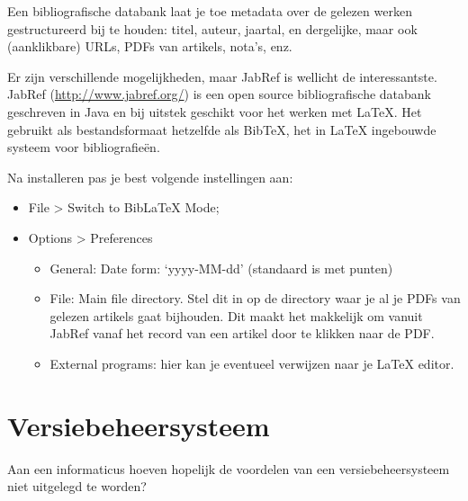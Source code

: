 Een bibliografische databank laat je toe metadata over de gelezen werken gestructureerd bij te houden: titel, auteur, jaartal, en dergelijke, maar ook (aanklikbare) URLs, PDFs van artikels, nota's, enz.

Er zijn verschillende mogelijkheden, maar JabRef is wellicht de interessantste. JabRef (\url{http://www.jabref.org/}) is een open source bibliografische databank geschreven in Java en bij uitstek geschikt voor het werken met {\LaTeX}. Het gebruikt als bestandsformaat hetzelfde als Bib{\TeX}, het in {\LaTeX} ingebouwde systeem voor bibliografieën.

Na installeren pas je best volgende instellingen aan:

\begin{itemize}
  \item File > Switch to BibLaTeX Mode;
  \item Options > Preferences
    \begin{itemize}
      \item General: Date form: `yyyy-MM-dd' (standaard is met punten)
      \item File: Main file directory. Stel dit in op de directory waar je al je PDFs van gelezen artikels gaat bijhouden. Dit maakt het makkelijk om vanuit JabRef vanaf het record van een artikel door te klikken naar de PDF.
      \item External programs: hier kan je eventueel verwijzen naar je {\LaTeX} editor.
    \end{itemize}
\end{itemize}

\section{Versiebeheersysteem}
\label{sec:versiebeheersysteem}

Aan een informaticus hoeven hopelijk de voordelen van een versiebeheersysteem niet uitgelegd te worden?
%

